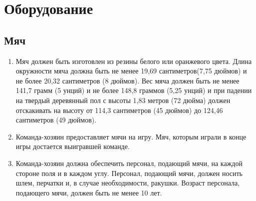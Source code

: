 \documentclass[../main.tex]{subfiles}
\begin{document}
\section{Оборудование}
\subsection{Мяч}

\begin{enumerate}
\item Мяч должен быть изготовлен из резины белого или оранжевого цвета. Длина окружности мяча должна быть не менее 19,69 сантиметров(7,75 дюймов) и не более 20,32 сантиметров (8 дюймов).\newline
Вес мяча должен быть не менее 141,7 грамм (5 унций) и не более 148,8 граммов (5,25 унций) и при падении на твердый деревянный пол с высоты 1,83 метров (72 дюйма) должен отскакивать на высоту от 114,3 сантиметров (45 дюймов) до 124,46 сантиметров (49 дюймов).
\item Команда-хозяин предоставляет мячи на игру. Мяч, которым играли в конце игры достается выигравшей команде.

\item Команда-хозяин должна обеспечить персонал, подающий мячи, на каждой стороне поля и в каждом углу.\newline
Персонал, подающий мячи, должен носить шлем, перчатки и, в случае необходимости, ракушки.\newline
Возраст персонала, подающего мячи, должен быть не менее 10 лет.

\end{enumerate}
\end{document}
